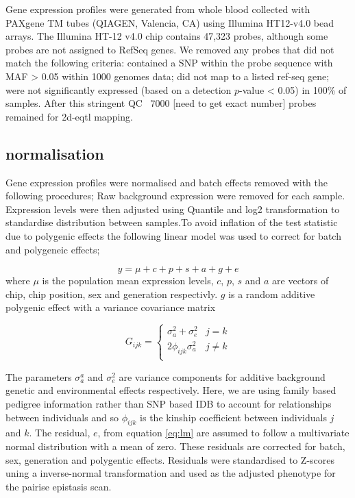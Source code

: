 \documentclass[paper=a4, fontsize=11pt]{scrartcl}	%
\numberwithin{equation}{section}									%
\numberwithin{figure}{section}										%
\numberwithin{table}{section}										%
\begin{document}
Gene expression profiles were generated from whole blood collected with PAXgene TM tubes (QIAGEN, Valencia, CA) using Illumina HT12-v4.0 bead arrays. The Illumina HT-12 v4.0 chip contains 47,323 probes, although some probes are not assigned to RefSeq genes. We removed any probes that did not match the following criteria: contained a SNP within the probe sequence with MAF > 0.05 within 1000 genomes data; did not map to a listed ref-seq gene; were not significantly expressed (based on a detection $p$-value < 0.05) in 100\% of samples. After this stringent QC ~7000 [need to get exact number] probes remained for 2d-eqtl mapping. 

\subsection{normalisation}

Gene expression profiles were normalised and batch effects removed with the following procedures; Raw background expression were removed for each sample. Expression levels were then adjusted using Quantile and log2 transformation to standardise distribution between samples.To avoid inflation of the test statistic due to polygenic effects the following linear model was used to correct for batch and polygeneic effects;  

\begin{equation}
y = \mu + c + p + s + a + g + e
\label{eq:lm}
\end{equation}
where $\mu$ is the population mean expression levels, $c$, $p$, $s$ and $a$ are vectors of chip, chip position, sex and generation respectivly. $g$ is a random additive polygenic effect with a variance covariance matrix 


\begin{equation}
G_{ijk} = \left \{ 
\begin{array}{ll}
\sigma _a ^2 + \sigma _e ^2&        j = k \\ 
2\phi _{ijk} \sigma _a ^2& 			j \neq k \\
\end{array} \right.
\end{equation}

The parameters $\sigma _a ^a$ and $\sigma _e ^2$ are variance components for additive background genetic and environmental effects respectively. Here, we are using family based pedigree information rather than SNP based IDB to account for relationships between individuals and so $\phi _{ijk}$ is the kinship coefficient between individuals $j$ and $k$. The residual, $e$, from equation \ref{eq:lm} are assumed to follow a multivariate normal distribution with a mean of zero. These residuals are corrected for batch, sex, generation and polygentic effects. Residuals were standardised to Z-scores uning a inverse-normal transformation and used as the adjusted phenotype for the pairise epistasis scan. 
\end{document}
